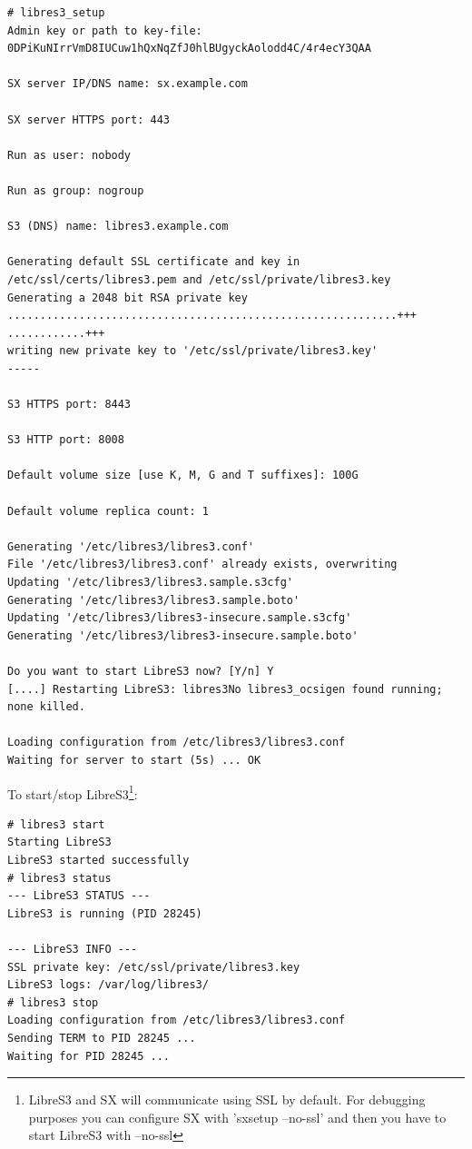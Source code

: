 \begin{lstlisting}
# libres3_setup
Admin key or path to key-file: 0DPiKuNIrrVmD8IUCuw1hQxNqZfJ0hlBUgyckAolodd4C/4r4ecY3QAA

SX server IP/DNS name: sx.example.com

SX server HTTPS port: 443

Run as user: nobody

Run as group: nogroup

S3 (DNS) name: libres3.example.com

Generating default SSL certificate and key in /etc/ssl/certs/libres3.pem and /etc/ssl/private/libres3.key
Generating a 2048 bit RSA private key
............................................................+++
............+++
writing new private key to '/etc/ssl/private/libres3.key'
-----

S3 HTTPS port: 8443

S3 HTTP port: 8008

Default volume size [use K, M, G and T suffixes]: 100G

Default volume replica count: 1

Generating '/etc/libres3/libres3.conf'
File '/etc/libres3/libres3.conf' already exists, overwriting
Updating '/etc/libres3/libres3.sample.s3cfg'
Generating '/etc/libres3/libres3.sample.boto'
Updating '/etc/libres3/libres3-insecure.sample.s3cfg'
Generating '/etc/libres3/libres3-insecure.sample.boto'

Do you want to start LibreS3 now? [Y/n] Y
[....] Restarting LibreS3: libres3No libres3_ocsigen found running; none killed.

Loading configuration from /etc/libres3/libres3.conf
Waiting for server to start (5s) ... OK
\end{lstlisting}


To start/stop LibreS3\footnote{LibreS3 and SX will communicate using SSL by
default. For debugging purposes you can configure SX with 'sxsetup --no-ssl' and then you have to start LibreS3 with --no-ssl}:


\begin{lstlisting}
# libres3 start
Starting LibreS3
LibreS3 started successfully
# libres3 status
--- LibreS3 STATUS ---
LibreS3 is running (PID 28245)

--- LibreS3 INFO ---
SSL private key: /etc/ssl/private/libres3.key
LibreS3 logs: /var/log/libres3/
# libres3 stop
Loading configuration from /etc/libres3/libres3.conf
Sending TERM to PID 28245 ... 
Waiting for PID 28245 ...
\end{lstlisting}



